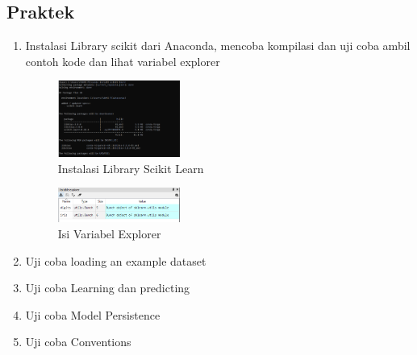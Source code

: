 \subsection{Praktek}
\begin{enumerate}
	\item Instalasi Library scikit dari Anaconda, mencoba kompilasi dan uji coba ambil contoh kode dan lihat variabel explorer
	\hfill\break
	\begin{figure}[H]
		\includegraphics[width=4cm]{figures/1174021/tugas1/materi/2.PNG}
		\centering
		\caption{Instalasi Library Scikit Learn}
	\end{figure}
	\begin{figure}[H]
		\includegraphics[width=4cm]{figures/1174021/tugas1/materi/3.PNG}
		\centering
		\caption{Isi Variabel Explorer}
	\end{figure}
	\item Uji coba loading an example dataset
	\hfill\break
	
	\item Uji coba Learning dan predicting
	\hfill\break
	
	\item Uji coba Model Persistence
	\hfill\break
	
	\item Uji coba Conventions
	\hfill\break
	
\end{enumerate}
